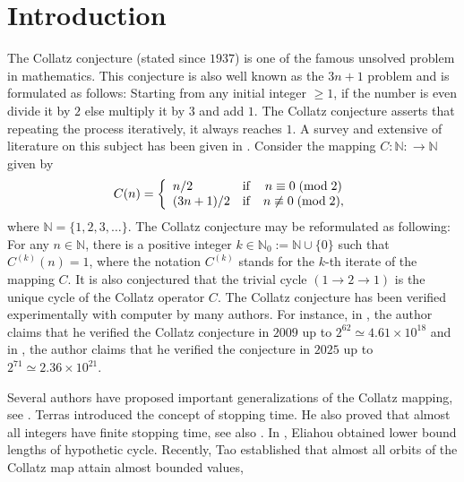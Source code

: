 \documentclass[11pt,a4paper]{article}
\newcommand*\modd[3]{#1\equiv#2\;( {\rm mod}\;  #3)}
\newcommand*\notmodd[3]{#1\not\equiv#2\;( {\rm mod}\;  #3)}
\begin{document}
\section{Introduction}\label{sec1}
The Collatz conjecture (stated since $1937$) is one of the famous unsolved problem in mathematics.   This conjecture is also  well known as  the $3n+1$ problem and  is formulated as follows: Starting from any initial integer  $\geq 1$, if the  number  is even divide it by $2$ else multiply it by $3$ and add $1$.  The Collatz conjecture asserts  that repeating  the process iteratively, it always reaches   $1$.  A survey and extensive of literature  on this subject has been given  in \cite{Lagarias1985,Lagarias2011}.  Consider the mapping $C:\mathbb{N}:\longrightarrow \mathbb{N}$ given by
\begin{equation}\label{CollatzMap}
	C(n)=\left\{\begin{array}{lcc}
		n/2&\mathrm{if}& \modd{n}{0}{2}\\ 
		(3n+1)/2&\mathrm{if}& \notmodd{n}{0}{2},\\
	\end{array}\right.
\end{equation}
where $\mathbb{N}=\{1,2,3,\ldots\}$.
The Collatz conjecture may be reformulated as following: For any $n\in\mathbb{N}$, there is a positive integer $k\in\mathbb{N}_0:=\mathbb{N}\cup\{0\}$ such that  $C^{(k)}(n)=1$, where the notation $C^{(k)}$ stands for the $k$-th iterate of the mapping $C$. 
It is also conjectured that the trivial cycle $(1\rightarrow 2\rightarrow 1)$ is  the unique cycle of the Collatz operator $C$.   The Collatz conjecture has been  verified experimentally with  computer  by many authors. For instance,  in  \cite{Oliviera2010}, the author claims that he verified the Collatz conjecture  in $2009$  up to 
$2^{62}\simeq 4.61\times 10^{18}$ and in  
\cite{Barina2025}, the author claims that he verified    the  conjecture  in $2025$  up to  $2^{71}\simeq 2.36\times 10^{21}$.

Several authors have proposed important generalizations of the Collatz  mapping, see \cite{Allouche1978,Crandall1978,Lagarias1985, MatthewsWatts1984}. Terras \cite{Terras1976} introduced the concept of stopping time. He also proved that almost all integers have finite stopping time, see also \cite{Everett1977}. In \cite{Eliahou1993}, Eliahou obtained  lower bound  lengths of hypothetic cycle. Recently, Tao \cite{Tao2020} established  that almost all orbits of the Collatz map attain almost bounded values,
 
\end{document}

